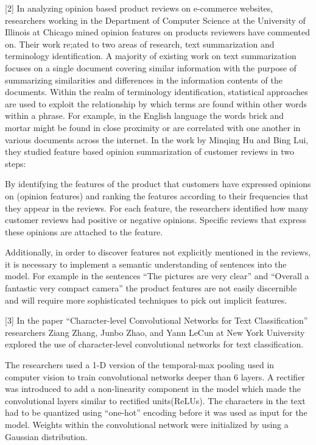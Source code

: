 \documentclass[conference]{IEEEtran}
\begin{document}
[2] In analyzing opinion based product reviews on e-commerce websites, researchers working in the Department of Computer Science at the University of Illinois at Chicago mined opinion features on products reviewers have commented on. Their work re;ated to two areas of research, text summarization and terminology identification. A majority of existing work on text summarization focuses on a single document covering similar information with the purpose of summarizing similarities and differences in the information contents of the documents. Within the realm of terminology identification, statistical approaches are used to exploit the relationship by which terms are found within other words within a phrase. For example, in the English language the words brick and mortar might be found in close proximity or are correlated with one another in various documents across the internet. In the work by Minqing Hu and Bing Lui, they studied feature based opinion summarization of customer reviews in two steps: 

By identifying the features of the product that customers have expressed opinions on (opinion features) and ranking the features according to their frequencies that they appear in the reviews.
For each feature, the researchers identified how many customer reviews had positive or negative opinions. Specific reviews that express these opinions are attached to the feature. 

Additionally, in order to discover features not explicitly mentioned in the reviews, it is necessary to implement a semantic understanding of sentences into the model. For example in the sentences “The pictures are very clear” and “Overall a fantastic very compact camera” the product features are not easily discernible and will require more sophisticated techniques to pick out implicit features. 

[3] In the paper “Character-level Convolutional Networks for Text Classification” researchers Ziang Zhang, Junbo Zhao, and Yann LeCun at New York University explored the use of character-level convolutional networks for text classification. 

The researchers used a 1-D version of the temporal-max pooling used in computer vision to train convolutional networks deeper than 6 layers. A rectifier was introduced to add a non-linearity component in the model which made the convolutional layers similar to rectified units(ReLUs). The characters in the text had to be quantized using “one-hot” encoding before it was used as input for the model. Weights within the convolutional network were initialized by using a Gaussian distribution. 
\end{document}
